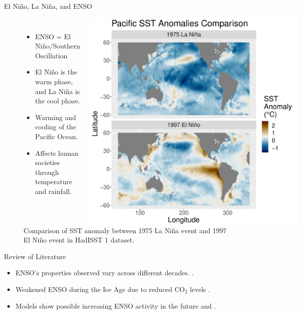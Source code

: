\documentclass{beamer}
\begin{document}
\begin{frame}{El Niño, La Niña, and ENSO}
  \begin{figure}
    \begin{columns}
      \begin{itemize}
      \item ENSO = El Niño/Southern Oscillation
      \item El Niño is the warm phase, and La Niña is the cool phase.
      \item Warming and cooling of the Pacific Ocean.
      \item Affects human societies through temperature and rainfall. \citep{ropelewski1987global}
      \end{itemize}
      \caption{Comparison of SST anomaly between 1975 La Niña event and 1997 El Niño event in HadISST 1 dataset. \citep{rayner2003global}}
      \includegraphics[width = \textwidth]{figures/intro_fig.pdf}
    \end{columns}
  \end{figure}
\end{frame}

\begin{frame}{Review of Literature}
  \begin{itemize}
  \item ENSO's properties observed vary across different decades. \citep{lubbecke2014assessing}.
  \item Weakened ENSO during the Ice Age due to reduced CO$_2$ levels \citep{zhu2017reduced}.
  \item Models show possible increasing ENSO activity in the future \citep{zheng2017response} and \citep{maher2018enso}.
  \end{itemize}
\end{frame}
\end{document}
